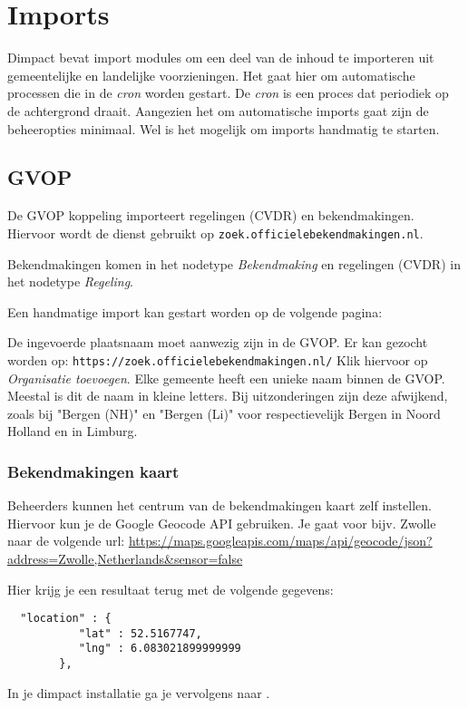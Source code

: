\section{Imports}

Dimpact bevat import modules om een deel van de inhoud te importeren uit gemeentelijke en landelijke voorzieningen. Het gaat hier om automatische processen die in de \emph{cron} worden gestart. De \emph{cron} is een proces dat periodiek op de achtergrond draait. Aangezien het om automatische imports gaat zijn de beheeropties minimaal. Wel is het mogelijk om imports handmatig te starten.


\subsection{GVOP}

De GVOP koppeling importeert regelingen (CVDR) en bekendmakingen. Hiervoor wordt de dienst gebruikt op \texttt{zoek.officielebekendmakingen.nl}.

Bekendmakingen komen in het nodetype \emph{Bekendmaking} en regelingen (CVDR) in het nodetype \emph{Regeling}.

Een handmatige import kan gestart worden op de volgende pagina: \\

De ingevoerde plaatsnaam moet aanwezig zijn in de GVOP. Er kan gezocht worden op:
\texttt{https://zoek.officielebekendmakingen.nl/}
Klik hiervoor op \emph{Organisatie toevoegen}.
Elke gemeente heeft een unieke naam binnen de GVOP. Meestal is dit de naam in kleine letters. Bij uitzonderingen zijn deze afwijkend, zoals bij "Bergen (NH)" en "Bergen (Li)" voor respectievelijk Bergen in Noord Holland en in Limburg.

\subsubsection{Bekendmakingen kaart}

Beheerders kunnen het centrum van de bekendmakingen kaart zelf instellen. Hiervoor kun je de Google Geocode API gebruiken. Je gaat voor bijv. Zwolle naar de volgende url:
\url{https://maps.googleapis.com/maps/api/geocode/json?address=Zwolle,Netherlands&sensor=false}

Hier krijg je een resultaat terug met de volgende gegevens:

\begin{verbatim}
  "location" : {
           "lat" : 52.5167747,
           "lng" : 6.083021899999999
        },
\end{verbatim}
In je dimpact installatie ga je vervolgens naar .

